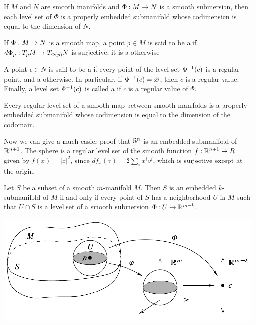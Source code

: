 \begin{cor}
If $M$ and $N$ are smooth manifolds and $\Phi:M\rightarrow N$ is a smooth submersion, then each level set of $\Phi$ is a properly embedded submanifold whose codimension is equal to the dimension of $N$.
\end{cor}

\dfn If $\Phi:M\rightarrow N$ is a smooth map, a point $p\in M$ is said to be a  if $d\Phi_p:T_pM\rightarrow T_{\Phi(p)}N$ is surjective; it is a  otherwise.

\dfn A point $c\in N$ is said to be a  if every point of the level set $\Phi^{-1}(c)$ is a regular point, and a otherwise. In particular, if $\Phi^{-1}(c) = \varnothing$, then $c$ is a regular value. Finally, a level set $\Phi^{-1}(c)$ is called a  if $c$ is a regular value of $\Phi$.

\begin{cor}
Every regular level set of a smooth map between smooth manifolds is a properly embedded submanifold whose codimension is equal to the dimension of the codomain.
\end{cor}

\begin{ex}
Now we can give a much easier proof that $\mathbb{S}^n$ is an embedded submanifold of $\mathbb{R}^{n + 1}$. The sphere is a regular level set of the smooth function $f:\mathbb{R}^{n + 1}\rightarrow R$ given by $f(x) = |x|^2$, since $df_x(v) = 2\sum_ix^iv^i$, which is surjective except at the origin.
\end{ex}

\begin{prop}
Let $S$ be a subset of a smooth $m$-manifold $M$. Then $S$ is an embedded $k$-submanifold of $M$ if and only if every point of $S$ has a neighborhood $U$ in $M$ such that $U\cap S$ is a level set of a smooth submersion $\Phi:U\rightarrow \mathbb{R}^{m - k}$.
\end{prop}

\begin{center}
    \includegraphics[scale = 0.43]{chapter05/c5f6.png}
\end{center}

